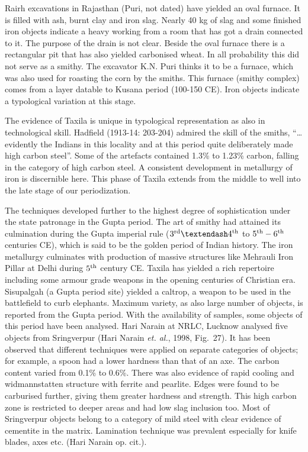 Rairh excavations in Rajasthan (Puri, not dated) have yielded an oval furnace. It is filled with ash, burnt clay and iron slag. Nearly 40 kg of slag and some finished iron objects indicate a heavy working from a room that has got a drain connected to it. The purpose of the drain is not clear. Beside the oval furnace there is a rectangular pit that has also yielded carbonised wheat. In all probability this did not serve as a smithy. The excavator K.N. Puri thinks it to be a furnace, which was also used for roasting the corn by the smiths. This furnace (smithy complex) comes from a layer datable to Kusana period (100-150 CE). Iron objects indicate a typological variation at this stage.

The evidence of Taxila is unique in typological representation as also in technological skill. Hadfield (1913-14: 203-204) admired the skill of the smiths, “…evidently the Indians in this locality and at this period quite deliberately made high carbon steel”. Some of the artefacts contained 1.3\% to 1.23\% carbon, falling in the category of high carbon steel. A consistent development in metallurgy of iron is discernible here. This phase of Taxila extends from the middle to well into the late stage of our periodization. 

The techniques developed further to the highest degree of sophistication under the state patronage in the Gupta period. The art of smithy had attained its culmination during the Gupta imperial rule ($3^{\rm rd} – 4^{\rm th}$ to $5^{\rm th} - 6^{\rm th}$ centuries CE), which is said to be the golden period of Indian history. The iron metallurgy culminates with production of massive structures like Mehrauli Iron Pillar at Delhi during $5^{\rm th}$ century CE. Taxila has yielded a rich repertoire including some armour grade weapons in the opening centuries of Christian era. Sisupalgah (a Gupta period site) yielded a caltrop, a weapon to be used in the battlefield to curb elephants. Maximum variety, as also large number of objects, is reported from the Gupta period. With the availability of samples, some objects of this period have been analysed. Hari Narain at NRLC, Lucknow analysed five objects from Sringverpur (Hari Narain {\it et. al.}, 1998, Fig.~27). It has been observed that different techniques were applied on separate categories of objects; for example, a spoon had a lower hardness than that of an axe. The carbon content varied from 0.1\% to 0.6\%. There was also evidence of rapid cooling and widmannstatten structure with ferrite and pearlite. Edges were found to be carburised further, giving them greater hardness and strength. This high carbon zone is restricted to deeper areas and had low slag inclusion too. Most of Sringverpur objects belong to a category of mild steel with clear evidence of cementite in the matrix. Lamination technique was prevalent especially for knife blades, axes etc. (Hari Narain op. cit.). 


